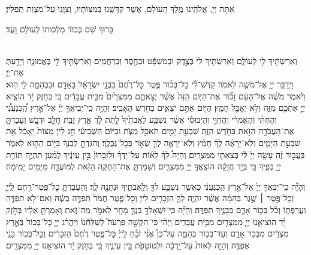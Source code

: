 \documentclass[twoside, openany, parskip=half, 11pt]{book}
\begin{document}
אַתָּה יְיָ, אֱלֹהֵֽינוּ מֶֽלֶךְ הָעוֺלָם, אֲשֶׁר קִדְּשָֽׁנוּ בְּמִצְוֹתָיו, וְצִוָֽנוּ עַל־מִצְוַת תְּפִלִּין׃

בָּרוּךְ שֵׁם כְּבוֺד מַלְכוּתוֺ לְעוֺלָם וָעֶד׃


\\
וְאֵרַשְׂתִּ֥יךְ לִ֖י לְעוֹלָ֑ם וְאֵרַשְׂתִּ֥יךְ לִי֙ בְּצֶ֣דֶק וּבְמִשְׁפָּ֔ט וּבְחֶ֖סֶד וּֽבְרַחֲמִֽים׃ וְאֵרַשְׂתִּ֥יךְ לִ֖י בֶּאֱמוּנָ֑ה וְיָדַ֖עַתְּ אֶת־יְיָ׃\\
וַיְדַבֵּ֥ר יְיָ֖ אֶל־מֹשֶׁ֥ה לֵּאמֹֽר׃ קַדֶּשׁ־לִ֨י כׇל־בְּכ֜וֹר פֶּ֤טֶר כׇּל־רֶ֙חֶם֙ בִּבְנֵ֣י יִשְׂרָאֵ֔ל בָּאָדָ֖ם וּבַבְּהֵמָ֑ה לִ֖י הֽוּא׃ וַיֹּ֨אמֶר מֹשֶׁ֜ה אֶל־הָעָ֗ם זָכ֞וֹר אֶת־הַיּ֤וֹם הַזֶּה֙ אֲשֶׁ֨ר יְצָאתֶ֤ם מִמִּצְרַ֙יִם֙ מִבֵּ֣ית עֲבָדִ֔ים כִּ֚י בְּחֹ֣זֶק יָ֔ד הוֹצִ֧יא יְיָ֛ אֶתְכֶ֖ם מִזֶּ֑ה וְלֹ֥א יֵאָכֵ֖ל חָמֵֽץ׃ הַיּ֖וֹם אַתֶּ֣ם יֹצְאִ֑ים בְּחֹ֖דֶשׁ הָאָבִֽיב׃ וְהָיָ֣ה כִֽי־יְבִיאֲךָ֣ יְיָ֡ אֶל־אֶ֣רֶץ הַֽ֠כְּנַעֲנִ֠י וְהַחִתִּ֨י וְהָאֱמֹרִ֜י וְהַחִוִּ֣י וְהַיְבוּסִ֗י אֲשֶׁ֨ר נִשְׁבַּ֤ע לַאֲבֹתֶ֙יךָ֙ לָ֣תֶת לָ֔ךְ אֶ֛רֶץ זָבַ֥ת חָלָ֖ב וּדְבָ֑שׁ וְעָבַדְתָּ֛ אֶת־הָעֲבֹדָ֥ה הַזֹּ֖את בַּחֹ֥דֶשׁ הַזֶּֽה׃ שִׁבְעַ֥ת יָמִ֖ים תֹּאכַ֣ל מַצֹּ֑ת וּבַיּוֹם֙ הַשְּׁבִיעִ֔י חַ֖ג לַייָ׃ מַצּוֹת֙ יֵֽאָכֵ֔ל אֵ֖ת שִׁבְעַ֣ת הַיָּמִ֑ים וְלֹֽא־יֵרָאֶ֨ה לְךָ֜ חָמֵ֗ץ וְלֹֽא־יֵרָאֶ֥ה לְךָ֛ שְׂאֹ֖ר בְּכׇל־גְּבֻלֶֽךָ׃ וְהִגַּדְתָּ֣ לְבִנְךָ֔ בַּיּ֥וֹם הַה֖וּא לֵאמֹ֑ר בַּעֲב֣וּר זֶ֗ה עָשָׂ֤ה יְיָ֙ לִ֔י בְּצֵאתִ֖י מִמִּצְרָֽיִם׃ וְהָיָה֩ לְךָ֨ לְא֜וֹת עַל־יָדְךָ֗ וּלְזִכָּרוֹן֙ בֵּ֣ין עֵינֶ֔יךָ לְמַ֗עַן תִּהְיֶ֛ה תּוֹרַ֥ת יְיָ֖ בְּפִ֑יךָ כִּ֚י בְּיָ֣ד חֲזָקָ֔ה הוֹצִֽאֲךָ֥ יְיָ֖ מִמִּצְרָֽיִם׃ וְשָׁמַרְתָּ֛ אֶת־הַחֻקָּ֥ה הַזֹּ֖את לְמוֹעֲדָ֑הּ מִיָּמִ֖ים יָמִֽימָה׃

וְהָיָ֞ה כִּֽי־יְבִאֲךָ֤ יְיָ֙ אֶל־אֶ֣רֶץ הַֽכְּנַעֲנִ֔י כַּאֲשֶׁ֛ר נִשְׁבַּ֥ע לְךָ֖ וְלַֽאֲבֹתֶ֑יךָ וּנְתָנָ֖הּ לָֽךְ׃ וְהַעֲבַרְתָּ֥ כׇל־פֶּֽטֶר־רֶ֖חֶם לַֽייָ֑ וְכׇל־פֶּ֣טֶר ׀ שֶׁ֣גֶר בְּהֵמָ֗ה אֲשֶׁ֨ר יִהְיֶ֥ה לְךָ֛ הַזְּכָרִ֖ים לַייָ׃ וְכׇל־פֶּ֤טֶר חֲמֹר֙ תִּפְדֶּ֣ה בְשֶׂ֔ה וְאִם־לֹ֥א תִפְדֶּ֖ה וַעֲרַפְתּ֑וֹ וְכֹ֨ל בְּכ֥וֹר אָדָ֛ם בְּבָנֶ֖יךָ תִּפְדֶּֽה׃ וְהָיָ֞ה כִּֽי־יִשְׁאָלְךָ֥ בִנְךָ֛ מָחָ֖ר לֵאמֹ֣ר מַה־זֹּ֑את וְאָמַרְתָּ֣ אֵלָ֔יו בְּחֹ֣זֶק יָ֗ד הוֹצִיאָ֧נוּ יְיָ֛ מִמִּצְרַ֖יִם מִבֵּ֥ית עֲבָדִֽים׃ וַיְהִ֗י כִּֽי־הִקְשָׁ֣ה פַרְעֹה֮ לְשַׁלְּחֵ֒נוּ֒ וַיַּהֲרֹ֨ג יְיָ֤ כׇּל־בְּכוֹר֙ בְּאֶ֣רֶץ מִצְרַ֔יִם מִבְּכֹ֥ר אָדָ֖ם וְעַד־בְּכ֣וֹר בְּהֵמָ֑ה עַל־כֵּן֩ אֲנִ֨י זֹבֵ֜חַ לַֽייָ֗ כׇּל־פֶּ֤טֶר רֶ֙חֶם֙ הַזְּכָרִ֔ים וְכׇל־בְּכ֥וֹר בָּנַ֖י אֶפְדֶּֽה׃ וְהָיָ֤ה לְאוֹת֙ עַל־יָ֣דְכָ֔ה וּלְטוֹטָפֹ֖ת בֵּ֣ין עֵינֶ֑יךָ כִּ֚י בְּחֹ֣זֶק יָ֔ד הוֹצִיאָ֥נוּ יְיָ֖ מִמִּצְרָֽיִם׃
\end{document}
